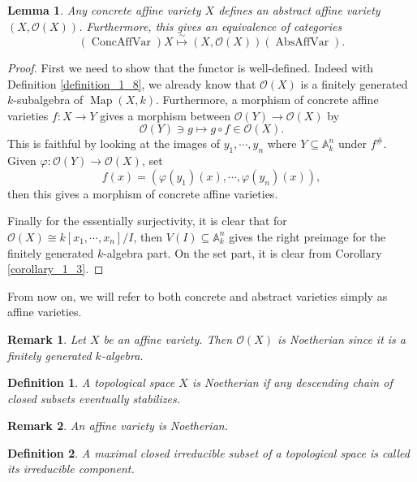\documentclass[10pt]{article}
\newtheorem{definition}{Definition}[section]
\newtheorem{lemma}{Lemma}[section]
\newtheorem{remark}{Remark}[section]
\numberwithin{equation}{theorem}
\DeclareMathOperator{\Map}{Map}
\DeclareMathOperator{\ConcAffVar}{ConcAffVar}
\DeclareMathOperator{\AbsAffVar}{AbsAffVar}
\newcommand{\Ouv}[0]{\mathcal{O}}
\newcommand{\A}[0]{\mathbb{A}}
\begin{document}
\begin{lemma}
Any concrete affine variety $X$ defines an abstract affine variety $(X,\Ouv(X))$. Furthermore, this gives an equivalence of categories
\begin{equation*}
(\ConcAffVar)X\stackrel{\sim}{\mapsto}(X,\Ouv(X))(\AbsAffVar).
\end{equation*}
\end{lemma}

\begin{proof}
First we need to show that the functor is well-defined. Indeed with Definition \ref{definition_1_8}, we already know that $\Ouv(X)$ is a finitely generated $k$-subalgebra of $\Map(X,k)$.
Furthermore, a morphism of concrete affine varieties $f:X\to Y$ gives a morphism between $\Ouv(Y)\to\Ouv(X)$ by 
\begin{equation*}
  \Ouv(Y)\ni g\mapsto g\circ f\in\Ouv(X).
\end{equation*}
This is faithful by looking at the images of $y_1,\cdots,y_n$ where $Y\subseteq \A^n_k$ under $f^\#$. Given $\varphi:\Ouv(Y)\to\Ouv(X)$, set
\begin{equation*}
  f(x) = (\varphi(y_1)(x),\cdots,\varphi(y_n)(x)),
\end{equation*}
then this gives a morphism of concrete affine varieties.
\par Finally for the essentially surjectivity, it is clear that for $\Ouv(X)\cong k[x_1,\cdots,x_n]/I$, then $V(I)\subseteq\A_k^n$ gives the right preimage for the finitely generated $k$-algebra part. On the set part, it is clear from Corollary \ref{corollary_1_3}.
\end{proof}

From now on, we will refer to both concrete and abstract varieties simply as affine varieties.
\begin{remark}
Let $X$ be an affine variety. Then $\Ouv(X)$ is Noetherian since it is a finitely generated $k$-algebra.
\end{remark}

\begin{definition}
A topological space $X$ is Noetherian if any descending chain of closed subsets eventually stabilizes.
\end{definition} 

\begin{remark}
An affine variety is Noetherian.
\end{remark}

\begin{definition}
A maximal closed irreducible subset of a topological space is called its irreducible component.
\end{definition}
\end{document}
